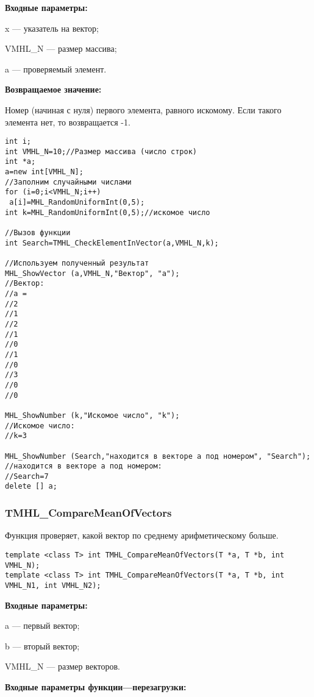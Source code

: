 \documentclass[a4paper,12pt]{article}
\begin{document}
\textbf{Входные параметры:}

   x --- указатель на вектор;
   
 VMHL\_N --- размер массива;
 
 a --- проверяемый элемент.

\textbf{Возвращаемое значение:}

 Номер (начиная с нуля) первого элемента, равного искомому. Если такого элемента нет, то возвращается -1.


\begin{lstlisting}[label=code_use_TMHL_CheckElementInVector,caption=Пример использования]
int i;
int VMHL_N=10;//Размер массива (число строк)
int *a;
a=new int[VMHL_N];
//Заполним случайными числами
for (i=0;i<VMHL_N;i++)
 a[i]=MHL_RandomUniformInt(0,5);
int k=MHL_RandomUniformInt(0,5);//искомое число

//Вызов функции
int Search=TMHL_CheckElementInVector(a,VMHL_N,k);

//Используем полученный результат
MHL_ShowVector (a,VMHL_N,"Вектор", "a");
//Вектор:
//a =
//2
//1
//2
//1
//0
//1
//0
//3
//0
//0

MHL_ShowNumber (k,"Искомое число", "k");
//Искомое число:
//k=3

MHL_ShowNumber (Search,"находится в векторе a под номером", "Search");
//находится в векторе a под номером:
//Search=7
delete [] a;
\end{lstlisting}

\subsubsection{TMHL\_CompareMeanOfVectors}\label{TMHL_CompareMeanOfVectors}

Функция проверяет, какой вектор по среднему арифметическому больше.


\begin{lstlisting}[label=code_syntax_TMHL_CompareMeanOfVectors,caption=Синтаксис]
template <class T> int TMHL_CompareMeanOfVectors(T *a, T *b, int VMHL_N);
template <class T> int TMHL_CompareMeanOfVectors(T *a, T *b, int VMHL_N1, int VMHL_N2);
\end{lstlisting}

\textbf{Входные параметры:}

a --- первый вектор;
 
b --- вторый вектор;
 
VMHL\_N --- размер векторов.
 
\textbf{Входные параметры функции---перезагрузки:}
 
\end{document}
